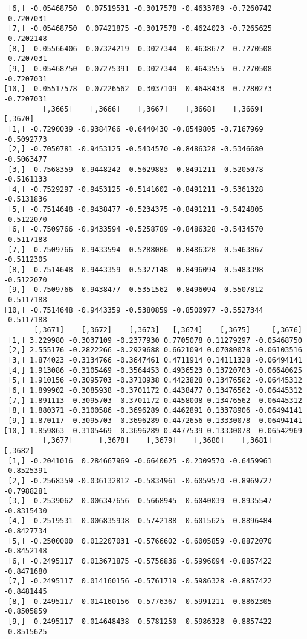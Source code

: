 \documentclass[
  letterpaper,
  DIV=11,
  numbers=noendperiod]{scrreprt}
\begin{document}
\begin{verbatim}
 [6,] -0.05468750  0.07519531 -0.3017578 -0.4633789 -0.7260742 -0.7207031
 [7,] -0.05468750  0.07421875 -0.3017578 -0.4624023 -0.7265625 -0.7202148
 [8,] -0.05566406  0.07324219 -0.3027344 -0.4638672 -0.7270508 -0.7207031
 [9,] -0.05468750  0.07275391 -0.3027344 -0.4643555 -0.7270508 -0.7207031
[10,] -0.05517578  0.07226562 -0.3037109 -0.4648438 -0.7280273 -0.7207031
         [,3665]    [,3666]    [,3667]    [,3668]    [,3669]    [,3670]
 [1,] -0.7290039 -0.9384766 -0.6440430 -0.8549805 -0.7167969 -0.5092773
 [2,] -0.7050781 -0.9453125 -0.5434570 -0.8486328 -0.5346680 -0.5063477
 [3,] -0.7568359 -0.9448242 -0.5629883 -0.8491211 -0.5205078 -0.5161133
 [4,] -0.7529297 -0.9453125 -0.5141602 -0.8491211 -0.5361328 -0.5131836
 [5,] -0.7514648 -0.9438477 -0.5234375 -0.8491211 -0.5424805 -0.5122070
 [6,] -0.7509766 -0.9433594 -0.5258789 -0.8486328 -0.5434570 -0.5117188
 [7,] -0.7509766 -0.9433594 -0.5288086 -0.8486328 -0.5463867 -0.5112305
 [8,] -0.7514648 -0.9443359 -0.5327148 -0.8496094 -0.5483398 -0.5122070
 [9,] -0.7509766 -0.9438477 -0.5351562 -0.8496094 -0.5507812 -0.5117188
[10,] -0.7514648 -0.9443359 -0.5380859 -0.8500977 -0.5527344 -0.5117188
       [,3671]    [,3672]    [,3673]   [,3674]    [,3675]     [,3676]
 [1,] 3.229980 -0.3037109 -0.2377930 0.7705078 0.11279297 -0.05468750
 [2,] 2.555176 -0.2822266 -0.2929688 0.6621094 0.07080078 -0.06103516
 [3,] 1.874023 -0.3134766 -0.3647461 0.4711914 0.14111328 -0.06494141
 [4,] 1.913086 -0.3105469 -0.3564453 0.4936523 0.13720703 -0.06640625
 [5,] 1.910156 -0.3095703 -0.3710938 0.4423828 0.13476562 -0.06445312
 [6,] 1.899902 -0.3085938 -0.3701172 0.4438477 0.13476562 -0.06445312
 [7,] 1.891113 -0.3095703 -0.3701172 0.4458008 0.13476562 -0.06445312
 [8,] 1.880371 -0.3100586 -0.3696289 0.4462891 0.13378906 -0.06494141
 [9,] 1.870117 -0.3095703 -0.3696289 0.4472656 0.13330078 -0.06494141
[10,] 1.859863 -0.3105469 -0.3696289 0.4477539 0.13330078 -0.06542969
         [,3677]      [,3678]    [,3679]    [,3680]    [,3681]    [,3682]
 [1,] -0.2041016  0.284667969 -0.6640625 -0.2309570 -0.6459961 -0.8525391
 [2,] -0.2568359 -0.036132812 -0.5834961 -0.6059570 -0.8969727 -0.7988281
 [3,] -0.2539062 -0.006347656 -0.5668945 -0.6040039 -0.8935547 -0.8315430
 [4,] -0.2519531  0.006835938 -0.5742188 -0.6015625 -0.8896484 -0.8427734
 [5,] -0.2500000  0.012207031 -0.5766602 -0.6005859 -0.8872070 -0.8452148
 [6,] -0.2495117  0.013671875 -0.5756836 -0.5996094 -0.8857422 -0.8471680
 [7,] -0.2495117  0.014160156 -0.5761719 -0.5986328 -0.8857422 -0.8481445
 [8,] -0.2495117  0.014160156 -0.5776367 -0.5991211 -0.8862305 -0.8505859
 [9,] -0.2495117  0.014648438 -0.5781250 -0.5986328 -0.8857422 -0.8515625

\end{verbatim}
\end{document}
